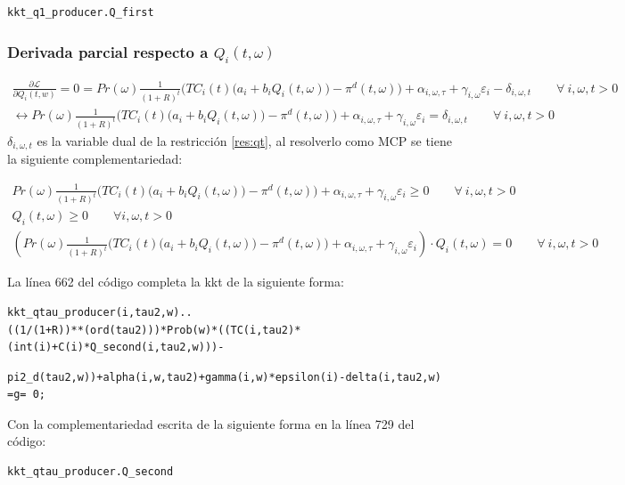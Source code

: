 \begin{verbatim}
kkt_q1_producer.Q_first    
\end{verbatim}


\subsubsection{Derivada parcial respecto a $Q_i(t,\omega)$}
\footnotesize{
\begin{align}
   \frac{\partial \mathcal{L} }{\partial Q_i(t,w)}= 
   0= Pr(\omega)  \frac{1}{(1+R)^t} \bigg( TC_i(t) \big(a_{i}+b_i Q_i(t,\omega)\big ) -\pi^d(t,\omega) \bigg) + \alpha_{i,\omega,\tau} + \gamma_{i,\omega} \varepsilon_{i} -\delta_{i,\omega,t} \qquad  \forall \ i, \omega, t > 0\\
   \leftrightarrow Pr(\omega)  \frac{1}{(1+R)^t} \bigg( TC_i(t) \big(a_{i}+b_i Q_i(t,\omega)\big ) -\pi^d(t,\omega) \bigg) + \alpha_{i,\omega,\tau} + \gamma_{i,\omega} \varepsilon_{i}= \delta_{i,\omega,t} \qquad \forall \ i, \omega, t > 0
\end{align}
}
$\delta_{i,\omega,t}$ es la variable dual de la restricción \ref{res:qt}, al resolverlo como MCP se tiene la siguiente complementariedad:

\footnotesize{
\begin{align}
    Pr(\omega)  \frac{1}{(1+R)^t} \bigg( TC_i(t) \big(a_{i}+b_i Q_i(t,\omega)\big ) -\pi^d(t,\omega) \bigg) + \alpha_{i,\omega,\tau} + \gamma_{i,\omega} \varepsilon_{i} \geq 0 \qquad \forall \ i, \omega, t > 0\\
    Q_i(t,\omega) \geq 0 \qquad  \forall i, \omega, t > 0\\
    (Pr(\omega)  \frac{1}{(1+R)^t} \bigg( TC_i(t) \big(a_{i}+b_i Q_i(t,\omega)\big ) -\pi^d(t,\omega) \bigg) + \alpha_{i,\omega,\tau} + \gamma_{i,\omega} \varepsilon_{i})\cdot  Q_i(t,\omega)= 0 \qquad \forall \ i, \omega, t > 0
\end{align}
}

La línea 662 del código completa la kkt de la siguiente forma: 

\begin{verbatim}
kkt_qtau_producer(i,tau2,w).. 
((1/(1+R))**(ord(tau2)))*Prob(w)*((TC(i,tau2)*(int(i)+C(i)*Q_second(i,tau2,w)))- 
\end{verbatim}
\begin{verbatim}
pi2_d(tau2,w))+alpha(i,w,tau2)+gamma(i,w)*epsilon(i)-delta(i,tau2,w) =g= 0;
\end{verbatim}

Con la complementariedad escrita de la siguiente forma en la línea 729 del código:
\begin{verbatim}
kkt_qtau_producer.Q_second    
\end{verbatim}

